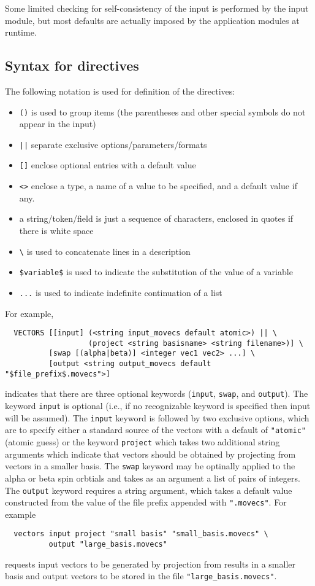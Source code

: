Some limited checking for self-consistency of the input is performed
by the input module, but most defaults are actually imposed by the
application modules at runtime. 

\subsection{Syntax for directives}

The following notation is used for definition of the directives:

\begin{itemize}
\item \verb+()+ is used to group items (the parentheses and other
      special symbols do not appear in the input)
\item \verb+||+ separate exclusive options/parameters/formats
\item \verb+[]+ enclose optional entries with a default value
\item \verb+<>+ enclose a type, a name of a value to be specified,
      and a default value if any.
\item a string/token/field is just a sequence of characters, enclosed in
      quotes if there is white space
\item \verb+\+ is used to concatenate lines in a description
\item \verb+$variable$+ is used to indicate the substitution of the value of a
      variable
\item \verb+...+ is used to indicate indefinite continuation of a list
\end{itemize}

For example,
\begin{verbatim}
  VECTORS [[input] (<string input_movecs default atomic>) || \
                   (project <string basisname> <string filename>)] \
          [swap [(alpha|beta)] <integer vec1 vec2> ...] \
          [output <string output_movecs default "$file_prefix$.movecs">]
\end{verbatim}
indicates that there are three optional keywords (\verb+input+,
\verb+swap+, and \verb+output+).  The keyword \verb+input+ is optional
(i.e., if no recognizable keyword is specified then input will be
assumed).  The \verb+input+ keyword is followed by two exclusive
options, which are to specify either a standard source of the vectors
with a default of \verb+"atomic"+ (atomic guess) or the keyword
\verb+project+ which takes two additional string arguments which
indicate that vectors should be obtained by projecting from vectors in
a smaller basis.  The \verb+swap+ keyword may be optinally applied to
the alpha or beta spin orbtials and takes as an argument a list of
pairs of integers. The \verb+output+ keyword requires a string
argument, which takes a default value constructed from the value of
the file prefix appended with \verb+".movecs"+.  For example
\begin{verbatim}
  vectors input project "small basis" "small_basis.movecs" \
          output "large_basis.movecs"
\end{verbatim}
requests input vectors to be generated by projection from
results in a smaller basis and output vectors to be stored in the file
\verb+"large_basis.movecs"+.

